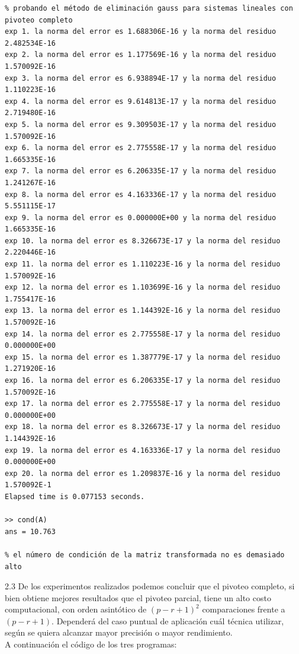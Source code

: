 \documentclass{article}
\begin{document}
\begin{lstlisting}
% probando el método de eliminación gauss para sistemas lineales con pivoteo completo
exp 1. la norma del error es 1.688306E-16 y la norma del residuo 2.482534E-16
exp 2. la norma del error es 1.177569E-16 y la norma del residuo 1.570092E-16
exp 3. la norma del error es 6.938894E-17 y la norma del residuo 1.110223E-16
exp 4. la norma del error es 9.614813E-17 y la norma del residuo 2.719480E-16
exp 5. la norma del error es 9.309503E-17 y la norma del residuo 1.570092E-16
exp 6. la norma del error es 2.775558E-17 y la norma del residuo 1.665335E-16
exp 7. la norma del error es 6.206335E-17 y la norma del residuo 1.241267E-16
exp 8. la norma del error es 4.163336E-17 y la norma del residuo 5.551115E-17
exp 9. la norma del error es 0.000000E+00 y la norma del residuo 1.665335E-16
exp 10. la norma del error es 8.326673E-17 y la norma del residuo 2.220446E-16
exp 11. la norma del error es 1.110223E-16 y la norma del residuo 1.570092E-16
exp 12. la norma del error es 1.103699E-16 y la norma del residuo 1.755417E-16
exp 13. la norma del error es 1.144392E-16 y la norma del residuo 1.570092E-16
exp 14. la norma del error es 2.775558E-17 y la norma del residuo 0.000000E+00
exp 15. la norma del error es 1.387779E-17 y la norma del residuo 1.271920E-16
exp 16. la norma del error es 6.206335E-17 y la norma del residuo 1.570092E-16
exp 17. la norma del error es 2.775558E-17 y la norma del residuo 0.000000E+00
exp 18. la norma del error es 8.326673E-17 y la norma del residuo 1.144392E-16
exp 19. la norma del error es 4.163336E-17 y la norma del residuo 0.000000E+00
exp 20. la norma del error es 1.209837E-16 y la norma del residuo 1.570092E-1
Elapsed time is 0.077153 seconds.

>> cond(A)
ans = 10.763

% el número de condición de la matriz transformada no es demasiado alto
\end{lstlisting}

2.3
De los experimentos realizados podemos concluir que el pivoteo completo, si bien obtiene mejores resultados que el pivoteo parcial, tiene un alto costo computacional, con orden asintótico de $(p - r + 1)^2$ comparaciones frente a $(p - r + 1)$. Dependerá del caso puntual de aplicación cuál técnica utilizar, según se quiera alcanzar mayor precisión o mayor rendimiento. \\

A continuación el código de los tres programas:\\
\end{document}
